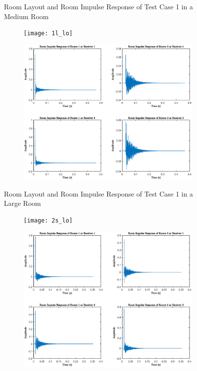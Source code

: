 \documentclass[a4paper,twoside,12pt,hidelinks]{article}
\begin{document}
\begin{appendices}
\begin{figure}[H]
\begin{subfigure}[H]{0.45\textwidth}
\end{subfigure}
\caption{Room Layout and Room Impulse Response of Test Case 1 in a Medium Room}
\end{figure}
\begin{figure}[H]
\centering
\begin{subfigure}[H]{0.4\textwidth}
\texttt{[image: 1l\_lo]}
\end{subfigure}
\begin{subfigure}[H]{0.45\textwidth}
\includegraphics[width=\textwidth]{1l_ir}
\end{subfigure}
\caption{Room Layout and Room Impulse Response of Test Case 1 in a Large Room}
\end{figure}
\newpage
\begin{figure}[H]
\centering
\begin{subfigure}[H]{0.44\textwidth}
\texttt{[image: 2s\_lo]}
\end{subfigure}
\begin{subfigure}[H]{0.55\textwidth}
\includegraphics[width=\textwidth]{2s_ir}

\end{subfigure}
\end{figure}
\end{appendices}
\end{document}
